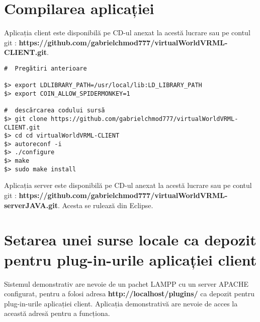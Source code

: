 \section{Compilarea aplicației}
\par Aplicația client este disponibilă pe CD-ul anexat la acestă lucrare sau pe contul git : \textbf{https://github.com/gabrielchmod777/virtualWorldVRML-CLIENT.git}.
\begin{verbatim}
#  Pregătiri anterioare

$> export LDLIBRARY_PATH=/usr/local/lib:LD_LIBRARY_PATH
$> export COIN_ALLOW_SPIDERMONKEY=1

#  descărcarea codului sursă
$> git clone https://github.com/gabrielchmod777/virtualWorldVRML-CLIENT.git
$> cd cd virtualWorldVRML-CLIENT
$> autoreconf -i
$> ./configure
$> make
$> sudo make install
\end{verbatim}
\par Aplicația server este disponibilă pe CD-ul anexat la acestă lucrare sau pe contul git : \textbf{https://github.com/gabrielchmod777/virtualWorldVRML-serverJAVA.git}. Acesta se rulează din Eclipse.
\section{Setarea unei surse locale ca depozit pentru plug-in-urile aplicației client}
\par Sistemul demonstrativ are nevoie de un pachet LAMPP cu un server APACHE configurat, pentru a folosi adresa \textbf{http://localhost/plugins/} ca depozit pentru plug-in-urile aplicației client. Aplicația demonstrativă are nevoie de acces la această adresă pentru a funcționa.  